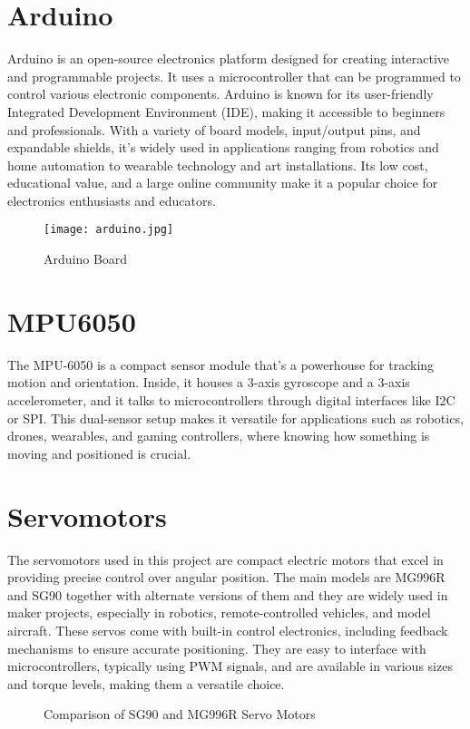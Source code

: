 \documentclass{Configuration_Files/PoliMi3i_thesis}
\begin{document}
\section{Arduino}
Arduino is an open-source electronics platform designed for creating interactive and programmable projects. It uses a microcontroller that can be programmed to control various electronic components. Arduino is known for its user-friendly Integrated Development Environment (IDE), making it accessible to beginners and professionals. With a variety of board models, input/output pins, and expandable shields, it's widely used in applications ranging from robotics and home automation to wearable technology and art installations. Its low cost, educational value, and a large online community make it a popular choice for electronics enthusiasts and educators.
\begin{figure}[h]
    \centering
    \texttt{[image: arduino.jpg]}
    \caption{Arduino Board}
\end{figure}
\section{MPU6050}
The MPU-6050 is a compact sensor module that's a powerhouse for tracking motion and orientation. Inside, it houses a 3-axis gyroscope and a 3-axis accelerometer, and it talks to microcontrollers through digital interfaces like I2C or SPI. This dual-sensor setup makes it versatile for applications such as robotics, drones, wearables, and gaming controllers, where knowing how something is moving and positioned is crucial.

\section{Servomotors}
The servomotors used in this project are compact electric motors that excel in providing precise control over angular position. The main models are MG996R and SG90 together with alternate versions of them and they are widely used in maker projects, especially in robotics, remote-controlled vehicles, and model aircraft. These servos come with built-in control electronics, including feedback mechanisms to ensure accurate positioning. They are easy to interface with microcontrollers, typically using PWM signals, and are available in various sizes and torque levels, making them a versatile choice.
\begin{figure}[h]
    \centering
    \hfill
    \caption{Comparison of SG90 and MG996R Servo Motors}
\end{figure}
\end{document}
